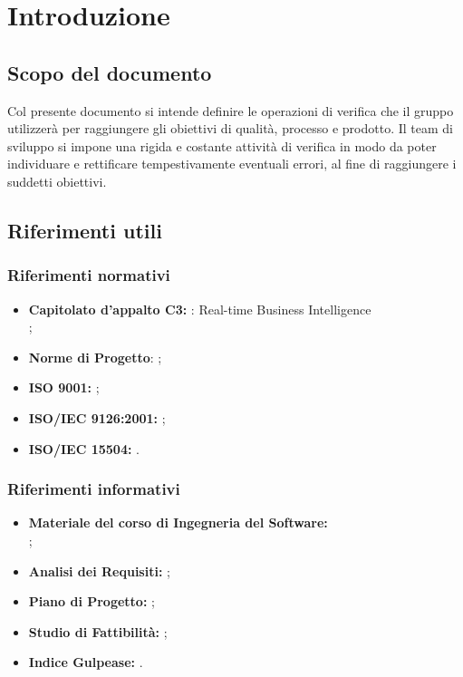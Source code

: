 
\section{Introduzione}
	
	\subsection{Scopo del documento}
		Col presente documento si intende definire le operazioni di verifica che il gruppo \groupname{} utilizzerà per raggiungere gli obiettivi di qualità, processo e prodotto. Il team di sviluppo si impone una rigida e costante attività di verifica in modo da poter individuare e rettificare tempestivamente eventuali errori, al fine di raggiungere i suddetti obiettivi. 
	
	

	\subsection{Riferimenti utili}		

		\subsubsection{Riferimenti normativi}
			\begin{itemize}
				\item\textbf{Capitolato d'appalto C3:} \projectname{}: Real-time Business Intelligence \\
					;
				\item \textbf{Norme di Progetto}: ;
				\item \textbf{ISO 9001:} ;
				\item \textbf{ISO/IEC 9126:2001:} ;
				\item \textbf{ISO/IEC 15504:} .
			\end{itemize}
		

		\subsubsection{Riferimenti informativi}
			\begin{itemize}
				\item \textbf{Materiale del corso di Ingegneria del Software:} \\
					;
				\item \textbf{Analisi dei Requisiti:} ;
				\item \textbf{Piano di Progetto:} ;
				\item \textbf{Studio di Fattibilità:} ;
				\item \textbf{Indice Gulpease:} .
			\end{itemize}
